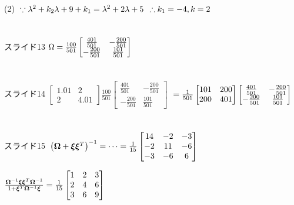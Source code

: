 \documentclass[12pt,a4paper]{article}
\begin{document}
\\
\\
(2)
$\\\because \lambda^2+k_2\lambda+9+k_1=\lambda^2+2\lambda+5$
$\\\therefore k_1=-4, k=2$
\\
\\
\\
スライド13
$\\\Omega=\frac{100}{501}
\begin{bmatrix}
\frac{401}{501} & -\frac{200}{501}\\
-\frac{200}{501} & \frac{101}{501}
\end{bmatrix}$
\\
\\
\\
スライド14
$\begin{bmatrix}
1.01 & 2\\
2 & 4.01
\end{bmatrix}
\frac{100}{501}
\begin{bmatrix}
\frac{401}{501} & -\frac{200}{501}\\
-\frac{200}{501} & \frac{101}{501}
\end{bmatrix}$
$\\=\frac{1}{501}
\begin{bmatrix}
101 & 200\\
200 & 401
\end{bmatrix}
\begin{bmatrix}
\frac{401}{501} & -\frac{200}{501}\\
-\frac{200}{501} & \frac{101}{501}
\end{bmatrix}$
\\
\\
\\
スライド15
$\\\left(\bm{\Omega}+\bm{\xi\xi}^T\right)^{-1}=\cdots=\frac{1}{15}
\begin{bmatrix}
14 & -2 & -3\\
-2 & 11 & -6\\
-3 & -6 & 6\\
\end{bmatrix}$

$\\\frac{\bm{\Omega}^{-1}\bm{\xi\xi}^T\bm{\Omega}^{-1}}{1+\bm{\xi}^T\bm{\Omega}^{-1}\bm{\xi}}=\frac{1}{15}
\begin{bmatrix}
1 & 2 & 3\\
2 & 4 & 6\\
3 & 6 & 9
\end{bmatrix}$
\end{document}

